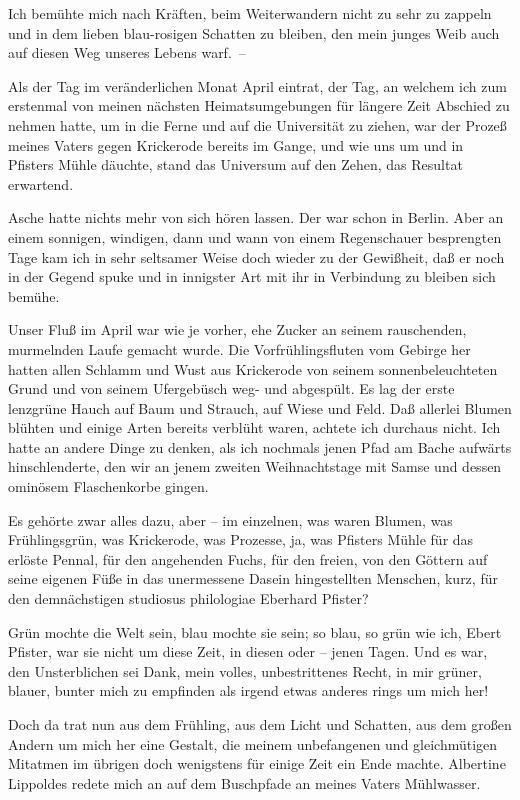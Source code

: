 Ich bemühte mich nach Kräften, beim Weiterwandern nicht zu sehr zu
zappeln und in dem lieben blau-rosigen Schatten zu bleiben, den
mein junges Weib auch auf diesen Weg unseres Lebens warf.~–

Als der Tag im veränderlichen Monat April eintrat, der Tag, an
welchem ich zum erstenmal von meinen nächsten Heimatsumgebungen für
längere Zeit Abschied zu nehmen hatte, um in die Ferne und auf die
Universität zu ziehen, war der Prozeß meines Vaters gegen
Krickerode bereits im Gange, und wie uns um und in Pfisters Mühle
däuchte, stand das Universum auf den Zehen, das Resultat
erwartend.

Asche hatte nichts mehr von sich hören lassen. Der war schon in
Berlin. Aber an einem sonnigen, windigen, dann und wann von einem
Regenschauer besprengten Tage kam ich in sehr seltsamer Weise doch
wieder zu der Gewißheit, daß er noch in der Gegend spuke und in
innigster Art mit ihr in Verbindung zu bleiben sich bemühe.

Unser Fluß im April war wie je vorher, ehe Zucker an seinem
rauschenden, murmelnden Laufe gemacht wurde. Die Vorfrühlingsfluten
vom Gebirge her hatten allen Schlamm und Wust aus Krickerode von
seinem sonnenbeleuchteten Grund und von seinem Ufergebüsch weg- und
abgespült. Es lag der erste lenzgrüne Hauch auf Baum und Strauch,
auf Wiese und Feld. Daß allerlei Blumen blühten und einige Arten
bereits verblüht waren, achtete ich durchaus nicht. Ich hatte an
andere Dinge zu denken, als ich nochmals jenen Pfad am Bache
aufwärts hinschlenderte, den wir an jenem zweiten Weihnachtstage
mit Samse und dessen ominösem Flaschenkorbe gingen.

Es gehörte zwar alles dazu, aber – im einzelnen, was waren Blumen,
was Frühlingsgrün, was Krickerode, was Prozesse, ja, was Pfisters
Mühle für das erlöste Pennal, für den angehenden Fuchs, für den
freien, von den Göttern auf seine eigenen Füße in das unermessene
Dasein hingestellten Menschen, kurz, für den demnächstigen
studiosus philologiae Eberhard Pfister?

Grün mochte die Welt sein, blau mochte sie sein; so blau, so grün
wie ich, Ebert Pfister, war sie nicht um diese Zeit, in diesen oder
– jenen Tagen. Und es war, den Unsterblichen sei Dank, mein volles,
unbestrittenes Recht, in mir grüner, blauer, bunter mich zu
empfinden als irgend etwas anderes rings um mich her!

Doch da trat nun aus dem Frühling, aus dem Licht und Schatten, aus
dem großen Andern um mich her eine Gestalt, die meinem unbefangenen
und gleichmütigen Mitatmen im übrigen doch wenigstens für einige
Zeit ein Ende machte. Albertine Lippoldes redete mich an auf dem
Buschpfade an meines Vaters Mühlwasser.

